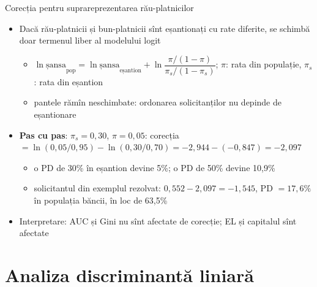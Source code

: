 \begin{frame}{Corecția pentru suprareprezentarea rău-platnicilor}
\itemsize{\small}
\begin{itemize}
    \item Dacă rău-platnicii și bun-platnicii sînt eșantionați cu rate diferite, se schimbă doar termenul liber al modelului logit
    \begin{itemize}
        \item $\ln\mathrm{șansa}_{\text{pop}} = \ln\mathrm{șansa}_{\text{eșantion}} + \ln\dfrac{\pi/(1 - \pi)}{\pi_s/(1 - \pi_s)}$; $\pi$: rata din populație, $\pi_s$: rata din eșantion
        \item pantele rămîn neschimbate: ordonarea solicitanților nu depinde de eșantionare
    \end{itemize}
    \item \textbf{Pas cu pas}: $\pi_s = 0{,}30$, $\pi = 0{,}05$: corecția $= \ln(0{,}05/0{,}95) - \ln(0{,}30/0{,}70) = -2{,}944 - (-0{,}847) = -2{,}097$
    \begin{itemize}
        \item o PD de 30\% în eșantion devine 5\%; o PD de 50\% devine 10{,}9\%
        \item solicitantul din exemplul rezolvat: $0{,}552 - 2{,}097 = -1{,}545$, PD $= 17{,}6\%$ în populația băncii, în loc de 63{,}5\%
    \end{itemize}
    \item Interpretare: AUC și Gini nu sînt afectate de corecție; EL și capitalul sînt afectate
\end{itemize}
\end{frame}


\section{Analiza discriminantă liniară}

